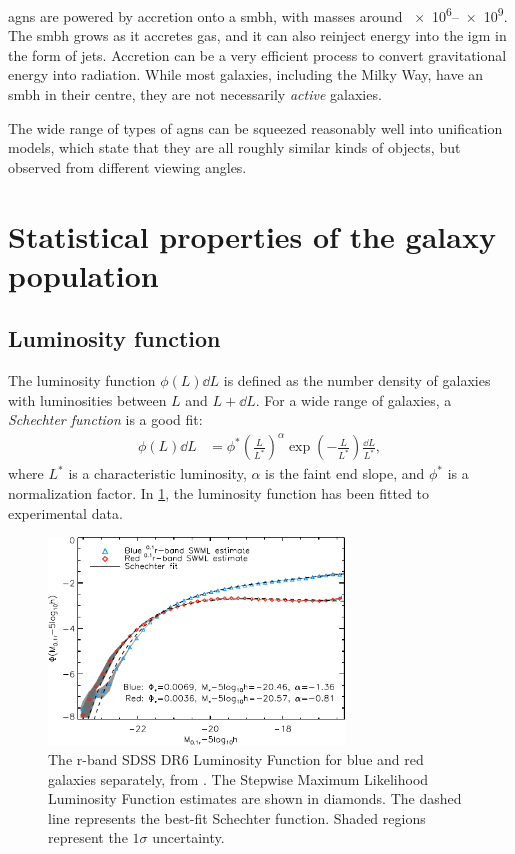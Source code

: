 \Acp{agn} are powered by accretion onto a \ac{smbh}, with masses around \SIrange{e6}{e9}{\solarmass}.
The \ac{smbh} grows as it accretes gas, and it can also reinject energy into the \ac{igm} in the form of jets.
Accretion can be a very efficient process to convert gravitational energy into radiation.
While most galaxies, including the Milky Way, have an \ac{smbh} in their centre, they are not necessarily \emph{active} galaxies.

The wide range of types of \acp{agn} can be squeezed reasonably well into unification models, which state that they are all roughly similar kinds of objects, but observed from different viewing angles.

\section{Statistical properties of the galaxy population}

\subsection{Luminosity function}
The luminosity function $\phi(L) \dd{L}$ is defined as the number density of galaxies with luminosities between $L$ and $L + \dd{L}$.
For a wide range of galaxies, a \emph{Schechter function} is a good fit:
\begin{align*}
	\phi(L) \dd{L}
	&= \phi^* \left( \frac{L}{L^*} \right)^\alpha
	\exp\left( - \frac{L}{L^*} \right)
	\frac{\dd{L}}{L^*},
\end{align*}
where
$L^*$ is a characteristic luminosity,
$\alpha$ is the faint end slope,
and $\phi^*$ is a normalization factor.
In \cref{fig:lum-func}, the luminosity function has been fitted to experimental data.
\begin{figure}
	\includegraphics[width=0.7\textwidth]{img/ch-05/luminosity-function.pdf}
	\caption{The r-band SDSS DR6 Luminosity Function for blue and red galaxies separately, from \cite{Montero_Dorta_2009}. The Stepwise Maximum Likelihood Luminosity Function estimates are shown in diamonds. The dashed line represents the best-fit Schechter function. Shaded regions represent the $1 \sigma$ uncertainty.}
	\label{fig:lum-func}
\end{figure}

